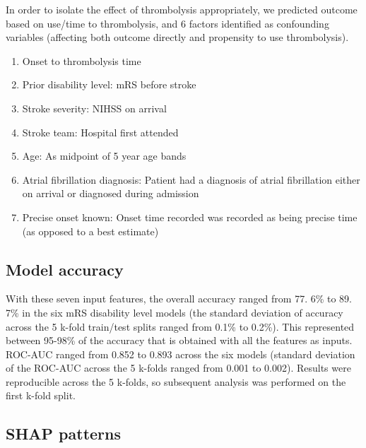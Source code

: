 \begin{minipage}{1.0\textwidth}

In order to isolate the effect of thrombolysis appropriately, we predicted outcome based on use/time to thrombolysis, and 6 factors identified as confounding variables (affecting both outcome directly and propensity to use thrombolysis).
    
\begin{enumerate}
    \item Onset to thrombolysis time
    \item Prior disability level: mRS before stroke
    \item Stroke severity: NIHSS on arrival
    \item Stroke team: Hospital first attended
    \item Age: As midpoint of 5 year age bands
    \item Atrial fibrillation diagnosis: Patient had a diagnosis of atrial fibrillation either on arrival or diagnosed during admission
    \item Precise onset known: Onset time recorded was recorded as being precise time (as opposed to a best estimate)
\end{enumerate}
\end{minipage}

\subsection{Model accuracy}

With these seven input features, the overall accuracy ranged from 77. 6\% to 89. 7\% in the six mRS disability level models (the standard deviation of accuracy across the 5 k-fold train/test splits ranged from 0.1\% to 0.2\%). This represented between 95-98\% of the accuracy that is obtained with all the features as inputs. ROC-AUC ranged from 0.852 to 0.893 across the six models (standard deviation of the ROC-AUC across the 5 k-folds ranged from 0.001 to 0.002). Results were reproducible across the 5 k-folds, so subsequent analysis was performed on the first k-fold split.

\subsection{SHAP patterns}

